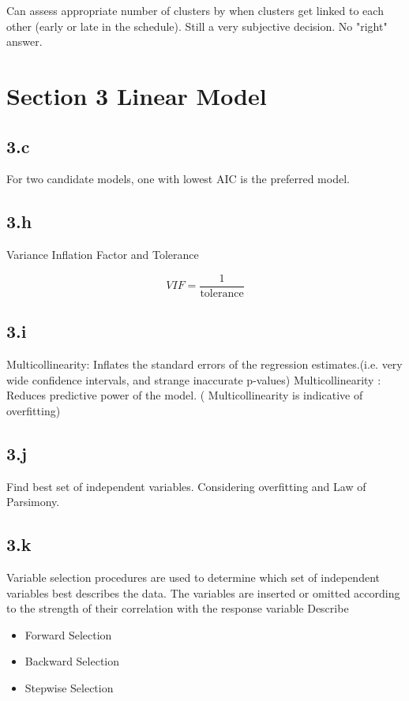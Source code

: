 \documentclass[11pt]{article} %
\begin{document}
Can assess appropriate number of clusters by when clusters get linked to each other (early or late in the schedule). Still a very subjective decision. No "right" answer.\\


\section*{Section 3 Linear Model}

\subsection*{3.c} For two candidate models, one with lowest AIC is the preferred model.

\subsection*{3.h}
Variance Inflation Factor and Tolerance

\[VIF = \frac{1}{\mbox{tolerance}}\]

\subsection*{3.i}
Multicollinearity: Inflates the standard errors of the regression estimates.(i.e. very wide confidence intervals, and strange inaccurate p-values)
Multicollinearity : Reduces predictive power of the model. ( Multicollinearity is indicative of 
overfitting)

\subsection*{3.j}
Find best set of independent variables. Considering overfitting and Law of Parsimony.

\subsection*{3.k} Variable selection procedures are used to determine which set of independent variables best describes the data. The variables are inserted or omitted according to the strength of their correlation with the response variable
Describe
\begin{itemize}
\item Forward Selection
\item Backward Selection
\item Stepwise Selection
\end{itemize}
\end{document}
